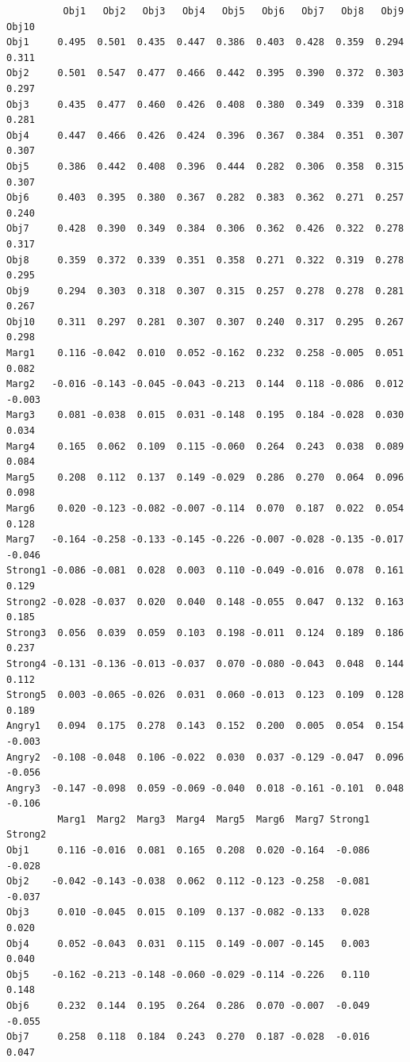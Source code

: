 \documentclass[
  english,
]{book}
\begin{document}
\begin{verbatim}
          Obj1   Obj2   Obj3   Obj4   Obj5   Obj6   Obj7   Obj8   Obj9  Obj10
Obj1     0.495  0.501  0.435  0.447  0.386  0.403  0.428  0.359  0.294  0.311
Obj2     0.501  0.547  0.477  0.466  0.442  0.395  0.390  0.372  0.303  0.297
Obj3     0.435  0.477  0.460  0.426  0.408  0.380  0.349  0.339  0.318  0.281
Obj4     0.447  0.466  0.426  0.424  0.396  0.367  0.384  0.351  0.307  0.307
Obj5     0.386  0.442  0.408  0.396  0.444  0.282  0.306  0.358  0.315  0.307
Obj6     0.403  0.395  0.380  0.367  0.282  0.383  0.362  0.271  0.257  0.240
Obj7     0.428  0.390  0.349  0.384  0.306  0.362  0.426  0.322  0.278  0.317
Obj8     0.359  0.372  0.339  0.351  0.358  0.271  0.322  0.319  0.278  0.295
Obj9     0.294  0.303  0.318  0.307  0.315  0.257  0.278  0.278  0.281  0.267
Obj10    0.311  0.297  0.281  0.307  0.307  0.240  0.317  0.295  0.267  0.298
Marg1    0.116 -0.042  0.010  0.052 -0.162  0.232  0.258 -0.005  0.051  0.082
Marg2   -0.016 -0.143 -0.045 -0.043 -0.213  0.144  0.118 -0.086  0.012 -0.003
Marg3    0.081 -0.038  0.015  0.031 -0.148  0.195  0.184 -0.028  0.030  0.034
Marg4    0.165  0.062  0.109  0.115 -0.060  0.264  0.243  0.038  0.089  0.084
Marg5    0.208  0.112  0.137  0.149 -0.029  0.286  0.270  0.064  0.096  0.098
Marg6    0.020 -0.123 -0.082 -0.007 -0.114  0.070  0.187  0.022  0.054  0.128
Marg7   -0.164 -0.258 -0.133 -0.145 -0.226 -0.007 -0.028 -0.135 -0.017 -0.046
Strong1 -0.086 -0.081  0.028  0.003  0.110 -0.049 -0.016  0.078  0.161  0.129
Strong2 -0.028 -0.037  0.020  0.040  0.148 -0.055  0.047  0.132  0.163  0.185
Strong3  0.056  0.039  0.059  0.103  0.198 -0.011  0.124  0.189  0.186  0.237
Strong4 -0.131 -0.136 -0.013 -0.037  0.070 -0.080 -0.043  0.048  0.144  0.112
Strong5  0.003 -0.065 -0.026  0.031  0.060 -0.013  0.123  0.109  0.128  0.189
Angry1   0.094  0.175  0.278  0.143  0.152  0.200  0.005  0.054  0.154 -0.003
Angry2  -0.108 -0.048  0.106 -0.022  0.030  0.037 -0.129 -0.047  0.096 -0.056
Angry3  -0.147 -0.098  0.059 -0.069 -0.040  0.018 -0.161 -0.101  0.048 -0.106
         Marg1  Marg2  Marg3  Marg4  Marg5  Marg6  Marg7 Strong1 Strong2
Obj1     0.116 -0.016  0.081  0.165  0.208  0.020 -0.164  -0.086  -0.028
Obj2    -0.042 -0.143 -0.038  0.062  0.112 -0.123 -0.258  -0.081  -0.037
Obj3     0.010 -0.045  0.015  0.109  0.137 -0.082 -0.133   0.028   0.020
Obj4     0.052 -0.043  0.031  0.115  0.149 -0.007 -0.145   0.003   0.040
Obj5    -0.162 -0.213 -0.148 -0.060 -0.029 -0.114 -0.226   0.110   0.148
Obj6     0.232  0.144  0.195  0.264  0.286  0.070 -0.007  -0.049  -0.055
Obj7     0.258  0.118  0.184  0.243  0.270  0.187 -0.028  -0.016   0.047

\end{verbatim}
\end{document}
